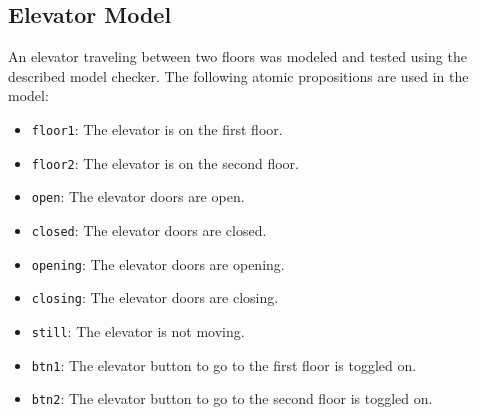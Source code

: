 \documentclass[a4paper, 11pt]{article}
\begin{document}
   \subsection{Elevator Model}
   An elevator traveling between two floors was modeled and
   tested using the described model checker. The following
   atomic propositions are used in the model:

   \begin{itemize}
      \item \texttt{floor1}: The elevator is on the first
         floor.
      \item \texttt{floor2}: The elevator is on the second
         floor.
      \item \texttt{open}: The elevator doors are open.
      \item \texttt{closed}: The elevator doors are closed.
      \item \texttt{opening}: The elevator doors are opening.
      \item \texttt{closing}: The elevator doors are closing.
      \item \texttt{still}: The elevator is not moving.
      \item \texttt{btn1}: The elevator button to go to the
         first floor is toggled on.
      \item \texttt{btn2}: The elevator button to go to the
         second floor is toggled on.
   \end{itemize}
   
\end{document}
